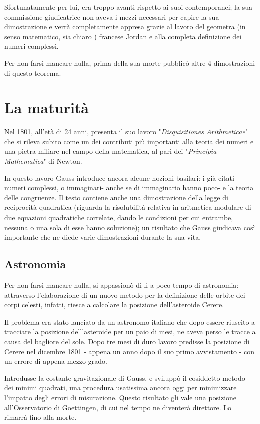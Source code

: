 Sfortunatamente per lui, era troppo avanti rispetto ai suoi contemporanei; la sua commissione giudicatrice non aveva i mezzi necessari per capire la sua dimostrazione e verrà completamente appresa grazie al lavoro del geometra (in senso matematico, sia chiaro  ) francese Jordan e alla completa definizione dei numeri complessi.

Per non farsi mancare nulla, prima della sua morte pubblicò altre 4 dimostrazioni di questo teorema.

\section{La maturità}

Nel 1801, all'età di 24 anni, presenta il suo lavoro "\emph{Disquisitiones Arithmeticae}" che si rileva subito
come un dei contributi più importanti alla teoria dei numeri e una pietra miliare nel campo della matematica, al pari dei "\emph{Principia Mathematica}" di Newton.

In questo lavoro Gauss introduce ancora alcune nozioni basilari: i già citati numeri complessi, o immaginari- anche se di immaginario hanno poco- e la teoria delle congruenze. Il testo contiene anche una dimostrazione della legge di reciprocità quadratica (riguarda la risolubilità relativa in aritmetica modulare di due equazioni quadratiche correlate, dando le condizioni per cui entrambe, nessuna o una sola di esse hanno soluzione); un risultato che Gauss giudicava così importante che ne diede varie dimostrazioni durante la sua vita.

\subsection{Astronomia}
Per non farsi mancare nulla, si appassionò di li a poco tempo di astronomia: attraverso l'elaborazione di un nuovo metodo per la definizione delle orbite dei corpi celesti, infatti, riesce a calcolare la posizione dell'asteroide Cerere.

Il problema era stato lanciato da un astronomo italiano che dopo essere riuscito a tracciare la posizione dell'asteroide per un paio di mesi, ne aveva perso le tracce a causa del bagliore del sole. Dopo tre mesi di duro lavoro predisse la posizione di Cerere nel dicembre 1801 - appena un anno dopo il suo primo avvistamento - con un errore di appena mezzo grado.

Introdusse la costante gravitazionale di Gauss, e sviluppò il cosiddetto metodo dei minimi quadrati, una procedura usatissima ancora oggi per minimizzare l'impatto degli errori di misurazione. Questo risultato gli vale una posizione all'Osservatorio di Goettingen, di cui nel tempo ne diventerà direttore. Lo rimarrà fino alla morte.

